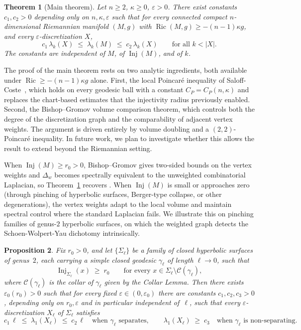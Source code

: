 \documentclass[10pt,reqno]{amsart}
\newtheorem{theorem}{Theorem}[section]
\newtheorem{proposition}[theorem]{Proposition}
\theoremstyle{remark}
\newcommand{\Ric}{\operatorname{Ric}}
\newcommand{\Inj}{\operatorname{Inj}}
\begin{document}
\begin{theorem}[Main theorem]
\label{thm:main}
Let $n\geq 2$, $\kappa\geq 0$, $\varepsilon>0$. There exist constants
$c_1,c_2>0$ depending only on $n,\kappa,\varepsilon$ such that for
every connected compact $n$-dimensional Riemannian manifold $(M,g)$
with $\Ric(M,g)\geq-(n-1)\kappa g$, and every
$\varepsilon$-discretization $X$,
\[
  c_1\,\lambda_k(X)\;\leq\;\lambda_k(M)\;\leq\;c_2\,\lambda_k(X)
  \qquad\text{for all }k<|X|.
\]
The constants are independent of $M$, of $\Inj(M)$, and of $k$.
\end{theorem}

The proof of the main theorem rests on two analytic ingredients, both available under
$\Ric\geq-(n-1)\kappa g$ alone. First, the local Poincar\'e inequality of
Saloff-Coste~\cite{SaloffCoste1992}, which holds on every geodesic
ball with a constant $C_P=C_P(n,\kappa)$ and replaces the chart-based
estimates that the injectivity radius previously enabled. Second,
the Bishop--Gromov volume comparison theorem, which controls both the
degree of the discretization graph and the comparability of adjacent
vertex weights. The argument is driven entirely by volume doubling and
a $(2,2)$-Poincar\'e inequality. In future work, we plan to
investigate whether this allows the result to extend beyond the
Riemannian setting.

When $\Inj(M)\geq r_0>0$, Bishop--Gromov gives two-sided bounds on
the vertex weights and $\Delta_w$ becomes spectrally equivalent to the
unweighted combinatorial Laplacian, so Theorem~\ref{thm:main} recovers
\cite[Theorem~3.7]{Mantuano2005}. When $\Inj(M)$ is small or
approaches zero (through pinching of hyperbolic surfaces, Berger-type
collapse, or other degenerations), the vertex weights adapt to the
local volume and maintain spectral control where the standard
Laplacian fails. We illustrate this on pinching families of genus-$2$ hyperbolic
surfaces, on which the weighted graph detects the
Schoen-Wolpert-Yau dichotomy intrinsically.

\begin{proposition}
\label{prop:intro-swy}
Fix $r_0>0$, and let $\{\Sigma_\ell\}$ be a family of closed
hyperbolic surfaces of genus~$2$, each carrying a simple closed
geodesic $\gamma_\ell$ of length $\ell\to0$, such that
\begin{equation}
\label{eq:intro-thick}
  \Inj_{\Sigma_\ell}(x)\;\geq\;r_0
  \qquad\text{for every }x\in\Sigma_\ell\setminus\mathcal C(\gamma_\ell),
\end{equation}
where $\mathcal C(\gamma_\ell)$ is the collar of $\gamma_\ell$ given by
the Collar Lemma. Then there exists $\varepsilon_0(r_0)>0$ such that for every fixed
$\varepsilon\in(0,\varepsilon_0)$ there are constants $c_1,c_2,c_3>0$,
depending only on $r_0,\varepsilon$ and in particular independent
of~$\ell$, such that every $\varepsilon$-discretization $X_\ell$ of
$\Sigma_\ell$ satisfies
\[
c_1\,\ell \;\leq\; \lambda_1(X_\ell) \;\leq\; c_2\,\ell
\quad\text{when $\gamma_\ell$ separates},
\qquad
\lambda_1(X_\ell) \;\geq\; c_3
\quad\text{when $\gamma_\ell$ is non-separating.}
\]
\end{proposition}
\end{document}

